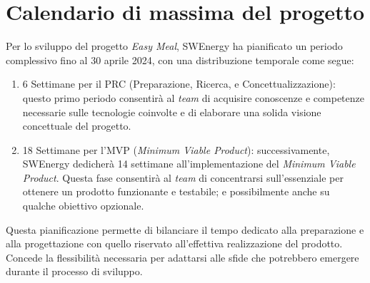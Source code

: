 \section{Calendario di massima del progetto}

Per lo sviluppo del progetto \textit{Easy Meal}, SWEnergy ha 
pianificato un periodo complessivo fino al 30 aprile 2024, con una distribuzione 
temporale come segue:
\begin{enumerate}
	\item 6 Settimane per il PRC (Preparazione, Ricerca, e Concettualizzazione): 
	questo primo periodo consentirà al \textit{team} di acquisire conoscenze e 
	competenze necessarie sulle tecnologie coinvolte e di elaborare una solida 
	visione concettuale del progetto.

	\item 18 Settimane per l'MVP (\textit{Minimum Viable Product}): 
	successivamente, SWEnergy dedicherà 14 settimane all'implementazione del
	\textit{Minimum Viable Product}. Questa fase consentirà al \textit{team} di 
	concentrarsi sull'essenziale per ottenere un prodotto funzionante e 
	testabile; e possibilmente anche su qualche obiettivo opzionale.
\end{enumerate}

\noindent
Questa pianificazione permette di bilanciare il tempo dedicato alla 
preparazione e alla progettazione con quello riservato all'effettiva 
realizzazione del prodotto. Concede la flessibilità necessaria per adattarsi 
alle sfide che potrebbero emergere durante il processo di sviluppo.
